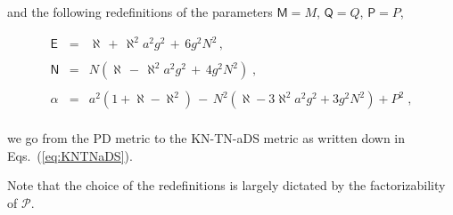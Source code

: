 \documentclass[12pt,a4paper]{article}
\begin{document}
\noindent and the following redefinitions of the parameters
$\mathsf{M}=M$, $\mathsf{Q}=Q$, $\mathsf{P}=P$, 

\begin{equation}
\label{eq:redefs}
\begin{array}{rcl}
\mathsf{E} & = & 
\aleph\,+\, \aleph^{2}a^{2}g^{2}\,+\, 6g^{2}N^{2}\, , \\
& & \\
\mathsf{N} & = & 
N\left( \aleph\,-\, \aleph^{2}a^{2}g^{2}\,+\, 4g^{2}N^{2}\right)\; , \\ 
& & \\
\alpha     & = & 
a^{2}\left( 1+\aleph -\aleph^{2} \right)
\,-\, N^{2}\left(\aleph -3\aleph^{2}a^{2}g^{2} +3g^{2}N^{2} \right) 
+P^{2}\; ,\\
\end{array}
\label{eq:D&P2redefinitions}
\end{equation}

\noindent  we go from the PD metric to the KN-TN-aDS metric as written
down in Eqs.~(\ref{eq:KNTNaDS}).

Note that the choice of the redefinitions is largely dictated by the
factorizability of $\mathcal{P}$.

\end{document}

